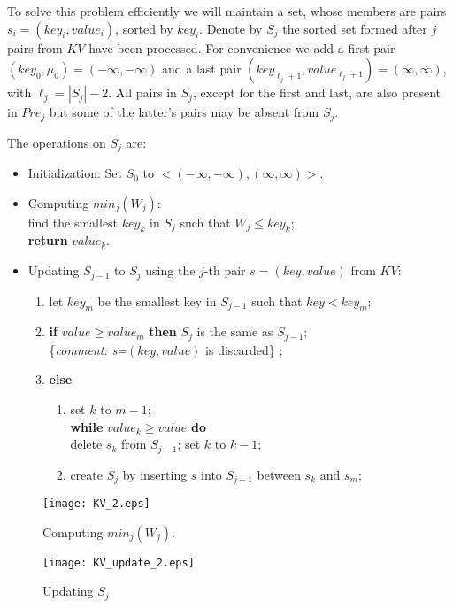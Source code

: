 To solve this problem efficiently we will maintain a set, whose members are 
pairs  $s_i=(key_{i}, value_{i})$, sorted by $key_i$.  
Denote by $S_j$ the sorted set formed after $j$ pairs
from $KV$ have been processed.
For convenience we add a first pair $(key_{0},\mu_{0})=(-\infty,-\infty)$
and a last pair
$(key_{\ell_j+1},value_{\ell_j+1})=(\infty,\infty)$, with $\ell_j=|S_j|-2$.
All pairs in $S_j$, except for the first and last, are also present in $Pre_j$ but some of the 
latter's pairs may be absent from $S_j$. 

The operations on $S_j$ are:
\begin{itemize}
	\item  Initialization: Set $S_0$ to $<(-\infty,-\infty), (\infty,\infty)>$.
	\item  Computing $min_j(W_j)$:\\
	find the smallest $key_{k}$ in $S_{j}$ such that 
	$W_j\leq key_{k}$;\\  \textbf{return} $value_{k}$.\\
	\item Updating $S_{j-1}$ to $S_j$ using the $j$-th pair $s=(key, value)$ from $KV$:
	\begin{enumerate}
		\item let $key_{m}$ be the smallest key in $S_{j-1}$ such that 
		$key < key_{m}$;
		\item {\bf if} $value\geq value_{m}$ \textbf{then} $S_j $ is the same as $S_{j-1}$;\\
		\{\emph{comment:  s=$(key,value)$ } is discarded\} ; \label{i.discard}
		\item \textbf{else} \label{i.else}
		  \begin{enumerate}
		  	\item set $k$ to $m-1$;\\  \textbf{while} $value_k \geq value $ \textbf{do} \\
		  		delete $s_k$ from $S_{j-1}$; set $k$ to  $k-1$;\label{i.while}
		  	\item  create $S_j$ by inserting $ s$ into $S_{j-1}$ between $s_k$ and $s_m$;
		  	\label{i.insert}
		  \end{enumerate} 
	\end{enumerate}
\end{itemize}
\begin{figure}[h]
	\centering
	\begin{minipage}{0.45\textwidth}
		\centering  
		\texttt{[image: KV\_2.eps]}
		\caption{Computing $min_j(W_j)$.}\label{fig:min_fig}
	\end{minipage}\hfill
	\begin{minipage}{0.45\textwidth}
		\centering 
		\texttt{[image: KV\_update\_2.eps]}
		\caption{Updating $S_j$}\label{fig:update_fig}
	\end{minipage}
\end{figure}

